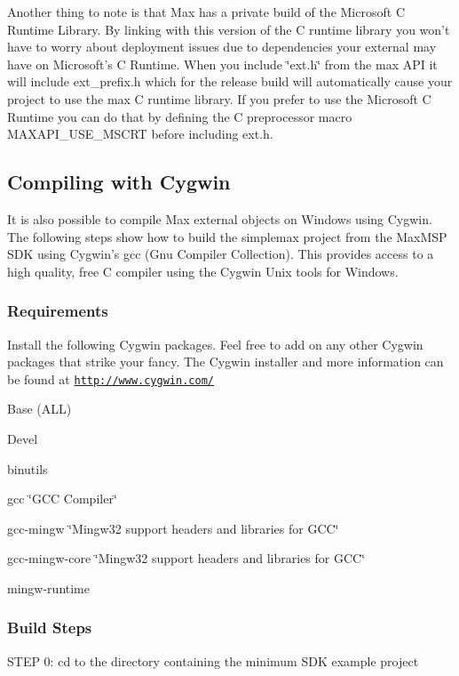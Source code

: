 Another thing to note is that Max has a private build of the Microsoft C Runtime Library. By linking with this version of the C runtime library you won't have to worry about deployment issues due to dependencies your external may have on Microsoft's C Runtime. When you include \char`\"{}ext.h\char`\"{} from the max API it will include ext\_\-prefix.h which for the release build will automatically cause your project to use the max C runtime library. If you prefer to use the Microsoft C Runtime you can do that by defining the C preprocessor macro MAXAPI\_\-USE\_\-MSCRT before including ext.h.\hypertarget{chapter_platform_chapter_platform_win_cygwin}{}\subsection{Compiling with Cygwin}\label{chapter_platform_chapter_platform_win_cygwin}
It is also possible to compile Max external objects on Windows using Cygwin. The following steps show how to build the simplemax project from the MaxMSP SDK using Cygwin's gcc (Gnu Compiler Collection). This provides access to a high quality, free C compiler using the Cygwin Unix tools for Windows.\hypertarget{chapter_platform_chapter_platform_win_cygwin_requirements}{}\subsubsection{Requirements}\label{chapter_platform_chapter_platform_win_cygwin_requirements}
Install the following Cygwin packages. Feel free to add on any other Cygwin packages that strike your fancy. The Cygwin installer and more information can be found at \href{http://www.cygwin.com/}{\tt http://www.cygwin.com/}


\begin{DoxyItemize}
\item Base (ALL)
\item Devel
\begin{DoxyItemize}
\item binutils
\item gcc \char`\"{}GCC Compiler\char`\"{}
\item gcc-\/mingw \char`\"{}Mingw32 support headers and libraries for GCC\char`\"{}
\item gcc-\/mingw-\/core \char`\"{}Mingw32 support headers and libraries for GCC\char`\"{}
\item mingw-\/runtime
\end{DoxyItemize}
\end{DoxyItemize}\hypertarget{chapter_platform_chapter_platform_win_cygwin_steps}{}\subsubsection{Build Steps}\label{chapter_platform_chapter_platform_win_cygwin_steps}
STEP 0: cd to the directory containing the minimum SDK example project

